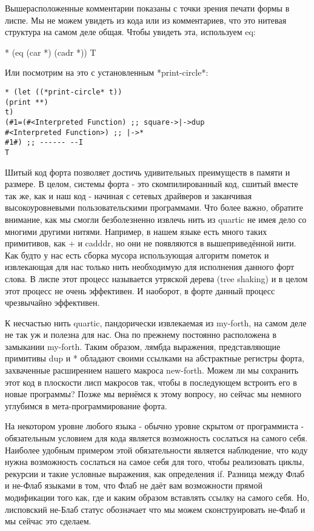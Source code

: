 {{{Вышерасположенные комментарии показаны с точки зрения печати формы в лиспе. Мы не можем увидеть из кода или из комментариев, что это нитевая структура на самом деле общая. Чтобы увидеть эта, используем eq:

* (eq (car *) (cadr *))
T

Или посмотрим на это с установленным *print-circle*:

\begin{verbatim}
* (let ((*print-circle* t))
(print **)
t)
(#1=(#<Interpreted Function) ;; square->|->dup
#<Interpreted Function>) ;; |->*
#1#) ;; ------ --I
T
\end{verbatim}

Шитый код форта позволяет достичь удивительных преимуществ в памяти и размере. В целом, системы форта - это скомпилированный код, сшитый вместе так же, как и наш код - начиная с сетевых драйверов и заканчивая высокоуровневыми пользовательскими программами. Что более важно, обратите внимание, как мы смогли безболезненно извлечь нить из quartic не имея дело со многими другими нитями. Например, в нашем языке есть много таких примитивов, как + и cadddr, но они не появляются в вышеприведённой нити. Как будто у нас есть сборка мусора использующая алгоритм пометок и извлекающая для нас только нить необходимую для исполнения данного форт слова. В лиспе этот процесс называется утряской дерева (tree shaking) и в целом этот процесс не очень эффективен. И наоборот, в форте данный процесс чрезвычайно эффективен.

К несчастью нить quartic, пандорически извлекаемая из my-forth, на самом деле не так уж и полезна для нас. Она по прежнему постоянно расположена в замыкании my-forth. Таким образом, лямбда выражения, представляющие примитивы dup и * обладают своими ссылками на абстрактные регистры форта, захваченные расширением нашего макроса new-forth. Можем ли мы сохранить этот код в плоскости лисп макросов так, чтобы в последующем встроить его в новые программы? Позже мы вернёмся к этому вопросу, но сейчас мы немного углубимся в мета-программирование форта.

На некотором уровне любого языка - обычно уровне скрытом от программиста - обязательным условием для кода является возможность сослаться на самого себя. Наиболее удобным примером этой обязательности является наблюдение, что коду нужна возможность сослаться на самое себя для того, чтобы реализовать циклы, рекурсии и такие условные выражения, как определения if. Разница между Флаб и не-Флаб языками в том, что Флаб не даёт вам возможности прямой модификации того как, где и каким образом вставлять ссылку на самого себя. Но, лисповский не-Блаб статус обозначает что мы можем сконструировать не-Флаб и мы сейчас это сделаем.

}}}

